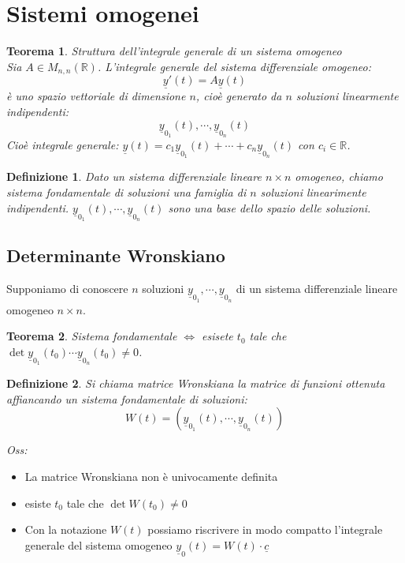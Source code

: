 \documentclass{scrreprt}
\newtheorem{defn}{Definizione}
\newenvironment{definition}{\begin{mdframed}[backgroundcolor=Ivory2]\begin{defn}}{\end{defn}\end{mdframed}}
\newtheorem{teorema}{Teorema}
\newenvironment{thm}{\begin{mdframed}[backgroundcolor=Ivory2]\begin{teorema}}{\end{teorema}\end{mdframed}}
\begin{document}
\section{Sistemi omogenei}
\begin{thm} Struttura dell'integrale generale di un sistema omogeneo\\
	Sia $A \in M_{n,n}(\mathbb{R})$. L'integrale generale del sistema differenziale omogeneo:
	\begin{equation}
		\underline{y}'(t) = A\underline{y}(t)
	\end{equation}
	è uno spazio vettoriale di dimensione $n$, cioè generato da $n$ soluzioni linearmente indipendenti:
	\begin{equation}
		\underline{y}_{0_1}(t), \cdots, \underline{y}_{0_n}(t)
	\end{equation}
	Cioè integrale generale: $\underline{y}(t) = c_1 \underline{y}_{0_1}(t) + \cdots + c_n \underline{y}_{0_n}(t)$ con $c_i \in \mathbb{R}$. 
\end{thm}

\begin{definition}
	Dato un sistema differenziale lineare $n\times n$ omogeneo, chiamo sistema fondamentale di soluzioni una famiglia di $n$ soluzioni linearimente indipendenti.
	$\underline{y}_{0_1}(t), \cdots, \underline{y}_{0_n}(t)$ sono una base dello spazio delle soluzioni.
\end{definition}

\subsection{Determinante Wronskiano}
Supponiamo di conoscere $n$ soluzioni $\underline{y}_{0_1}, \cdots, \underline{y}_{0_n}$ di un sistema differenziale lineare omogeneo $n\times n$.
\begin{thm}
	Sistema fondamentale $\Leftrightarrow$ esisete $t_0$ tale che $\det{\underline{y}_{0_1}(t_0) \cdots \underline{y}_{0_n}(t_0)} \neq 0$.
\end{thm}
\begin{definition}
	Si chiama matrice Wronskiana la matrice di funzioni ottenuta affiancando un sistema fondamentale di soluzioni:
	\begin{equation}
		W(t) = (\underline{y}_{0_1}(t), \cdots, \underline{y}_{0_n}(t))
	\end{equation}
\end{definition}
\emph{Oss:}
\begin{itemize}
	\item La matrice Wronskiana non è univocamente definita
	\item esiste $t_0$ tale che $\det{W(t_0)} \neq 0$
	\item Con la notazione $W(t)$ possiamo riscrivere in modo compatto l'integrale generale del sistema omogeneo $\underline{y}_0(t) = W(t) \cdot \underline{c}$
\end{itemize}
\end{document}
